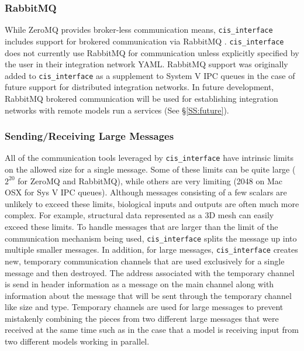 \documentclass[journal]{IEEEtran}
\newcommand{\cis}{{\tt cis\_interface}{}}
\begin{document}
\subsubsection{RabbitMQ}\label{SSS:rmq}
%
While ZeroMQ provides broker-less communication means, {\cis} includes support 
for brokered communication via RabbitMQ \citep{RMQ}. {\cis} does not currently use 
RabbitMQ for communication unless explicitly specified by the user in their 
integration network YAML. RabbitMQ support was originally added to {\cis} 
as a supplement to System V IPC queues in the case of future support for distributed 
integration networks. In future development, RabbitMQ brokered communication will be 
used for establishing integration networks with remote models run a services 
(See \S\ref{SS:future}).

\subsubsection{Sending/Receiving Large Messages}\label{SSS:large}
%
All of the communication tools leveraged by {\cis} have intrinsic limits 
on the allowed size for a single message. Some of these limits can be quite large 
($2^{20}$ for ZeroMQ and RabbitMQ), while others are very limiting 
(2048 on Mac OSX for Sys V IPC queues). Although messages consisting of a few scalars are unlikely to 
exceed these limits, biological inputs and outputs are often much more complex. 
For example, structural data represented as a 3D mesh can easily exceed these 
limits. To handle messages that are larger than the limit of the communication 
mechanism being used, {\cis} splits the message up into multiple smaller 
messages. In addition, for large messages, {\cis} creates new, temporary 
communication channels that are used exclusively for a single message and 
then destroyed. The address associated with the temporary channel is send in 
header information as a message on the main channel along with information about 
the message that will be sent through the temporary channel like size and type. 
Temporary channels are used for large messages to prevent mistakenly combining 
the pieces from two different large messages that were received at the same time 
such as in the case that a model is receiving input from two different models 
working in parallel.
\end{document}
